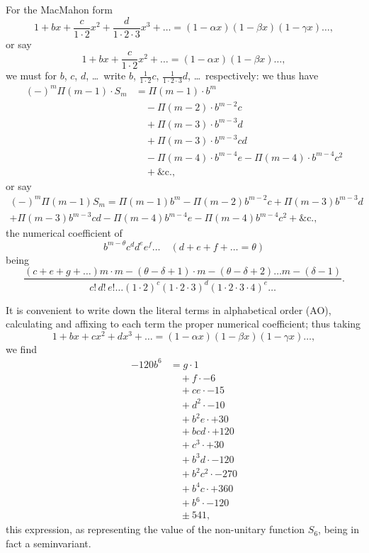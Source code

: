 \documentclass[11pt,a4paper]{book}
\begin{document}
{{{For the MacMahon form
\[
1 + bx + \frac{c}{1 \cdot 2}x^2 + \frac{d}{1 \cdot 2 \cdot 3}x^3 + \ldots = (1 - \alpha x)(1 - \beta x)(1 - \gamma x)\ldots,
\]
or say
\[
1 + bx + \frac{c}{1 \cdot 2}x^2 + \ldots = (1 - \alpha x)(1 - \beta x)\ldots,
\]
we must for $b$, $c$, $d$, \ldots\ write $b$, $\frac{1}{1 \cdot 2}c$, $\frac{1}{1 \cdot 2 \cdot 3}d$, \ldots\ respectively: we thus have
\begin{align*}
(-)^m \Pi(m-1) \cdot S_m &= \Pi(m-1) \cdot b^m\\
&\quad - \Pi(m-2) \cdot b^{m-2}c\\
&\quad + \Pi(m-3) \cdot b^{m-3}d\\
&\quad + \Pi(m-3) \cdot b^{m-3}cd\\
&\quad - \Pi(m-4) \cdot b^{m-4}e - \Pi(m-4) \cdot b^{m-4}c^2\\
&\quad + \&\text{c.},
\end{align*}
or say
\begin{multline*}
(-)^m \Pi(m-1) S_m = \Pi(m-1)b^m - \Pi(m-2)b^{m-2}c + \Pi(m-3)b^{m-3}d\\
+ \Pi(m-3)b^{m-3}cd - \Pi(m-4)b^{m-4}e - \Pi(m-4)b^{m-4}c^2 + \&\text{c.},
\end{multline*}
the numerical coefficient of
\[
b^{m-\theta} c^d d^e e^f \ldots \quad (d + e + f + \ldots = \theta)
\]
being
\[
\frac{(c + e + g + \ldots)m \cdot m - (\theta - \delta + 1) \cdot m - (\theta - \delta + 2) \ldots m - (\delta - 1)}{c!\,d!\,e!\ldots (1 \cdot 2)^c (1 \cdot 2 \cdot 3)^d (1 \cdot 2 \cdot 3 \cdot 4)^e \ldots}.
\]

\newpage
It is convenient to write down the literal terms in alphabetical order (AO),
calculating and affixing to each term the proper numerical coefficient; thus taking
\[
1 + bx + cx^2 + dx^3 + \ldots = (1 - \alpha x)(1 - \beta x)(1 - \gamma x)\ldots,
\]
we find
\begin{align*}
-120b^6 &= g \cdot 1\\
&\quad + f \cdot -6\\
&\quad + ce \cdot -15\\
&\quad + d^2 \cdot -10\\
&\quad + b^2e \cdot +30\\
&\quad + bcd \cdot +120\\
&\quad + c^3 \cdot +30\\
&\quad + b^3d \cdot -120\\
&\quad + b^2c^2 \cdot -270\\
&\quad + b^4c \cdot +360\\
&\quad + b^6 \cdot -120\\
&\quad \pm 541,
\end{align*}
this expression, as representing the value of the non-unitary function $S_6$, being in
fact a seminvariant.

}}}
\end{document}
